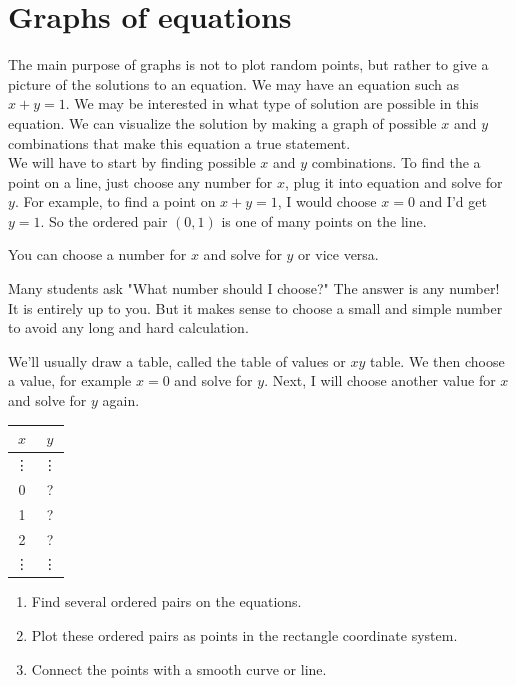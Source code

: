 \section{Graphs of equations}
The main purpose of graphs is not to plot random points, but rather to give a picture of the solutions to an equation. We may have an equation such as $x+y=1$. We may be interested in what type of solution are possible in this equation. We can visualize the solution by making a graph of possible $x$ and $y$ combinations that make this equation a true statement.\\
We will have to start by finding possible $x$ and $y$
combinations. To find the a point on a line, just choose any number for $x$, plug it into
equation and solve for $y$. For example, to find a point on $x+y=1$, I would choose $x=0$ and I'd get $y=1$. So the ordered pair $(0,1)$ is one of many points on the line.
\begin{fact}
	You can choose a number for $x$ and solve for $y$ or vice
	versa.
\end{fact}
\begin{fact}
	Many students ask "What number should I choose?" The answer is any number! It
    is entirely up to you. But it makes sense to choose a small and simple number 
    to avoid any long and hard calculation.
\end{fact}
\vspace{0.4cm}
We'll usually draw a table, called the table of values or $xy$ table. We then choose a value, for example $x=0$ and
solve for $y$. Next, I will choose another value for $x$ and solve for $y$ again. 
\begin{center}
\begin{tabular}{ c | c }
    $x$ & $y$ \\ \hline
    \vdots	&  \vdots  \\
    0	&  ?  \\
    1   &  ?  \\
    2   &  ?  \\
    \vdots & \vdots
\end{tabular}
\end{center}
\begin{tcolorbox}[title=Steps to graph any equations,
                    fonttitle=\bfseries,
                    colframe=blue!70!red,
                    colback=white]
\begin{enumerate}[(1)]
    \item Find several ordered pairs on the equations.
    \item Plot these ordered pairs as points in the rectangle coordinate system.
    \item Connect the points with a smooth curve or line.
\end{enumerate}
\end{tcolorbox}
